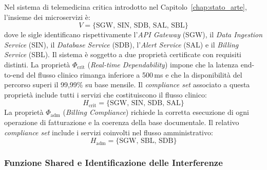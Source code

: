 Nel sistema di telemedicina critica introdotto nel Capitolo~\ref{chap:stato_arte}, l'insieme dei
microservizi è:
\begin{equation}
\label{eq:V_telemed}
V = \{\text{SGW},\, \text{SIN},\, \text{SDB},\, \text{SAL},\, \text{SBL}\}
\end{equation}
dove le sigle identificano rispettivamente l'\textit{API Gateway} (SGW), il \textit{Data Ingestion
Service} (SIN), il \textit{Database Service} (SDB), l'\textit{Alert Service} (SAL) e il
\textit{Billing Service} (SBL). Il sistema è soggetto a due proprietà certificate con requisiti
distinti.
La proprietà $\Phi_{\text{crit}}$ (\textit{Real-time Dependability}) impone che la latenza
end-to-end del flusso clinico rimanga inferiore a 500\,ms e che la disponibilità del percorso
superi il 99,99\% su base mensile. Il \textit{compliance set} associato a questa proprietà include
tutti i servizi che costituiscono il flusso clinico:
\begin{equation}
\label{eq:h_crit}
H_{\text{crit}} = \{\text{SGW},\, \text{SIN},\, \text{SDB},\, \text{SAL}\}
\end{equation}
La proprietà $\Phi_{\text{adm}}$ (\textit{Billing Compliance}) richiede la corretta esecuzione di
ogni operazione di fatturazione e la coerenza della base documentale. Il relativo
\textit{compliance set} include i servizi coinvolti nel flusso amministrativo:
\begin{equation}
\label{eq:h_adm}
H_{\text{adm}} = \{\text{SGW},\, \text{SBL},\, \text{SDB}\}
\end{equation}
\subsubsection{Funzione Shared e Identificazione delle Interferenze}
\label{sec:funzione_shared}

